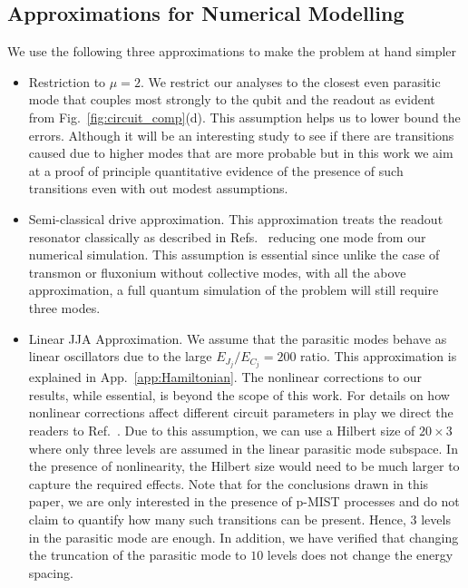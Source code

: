 \documentclass[%
reprint,
superscriptaddress,
 amsmath,amssymb,
 aps,
 prx,
longbibliography,
floatfix,
]{revtex4-2}
\newcommand{\singh}[1]{{\color{orange}{{}#1}}}%
\begin{document}
\subsection{Approximations for Numerical Modelling}\label{app:numerics}
We use the following three approximations to make the problem at hand simpler
\begin{itemize}
    \item Restriction to $\mu=2$. We restrict our analyses to the closest even parasitic mode that couples most strongly to the qubit and the readout as evident from Fig.~\ref{fig:circuit_comp}(d). This assumption helps us to lower bound the errors. Although it will be an interesting study to see if there are transitions caused due to higher modes that are more probable but in this work we aim at a proof of principle quantitative evidence of the presence of such transitions even with out modest assumptions.

    \item Semi-classical drive approximation. This approximation treats the readout resonator classically as described in Refs.~\cite{xiao2023diagrammatic,dumas2024unified,cohen2023reminiscence,khezri2023measurement} reducing one mode from our numerical simulation. This assumption is essential since unlike the case of transmon or fluxonium without collective modes, with all the above approximation, a full quantum simulation of the problem will still require three modes.

    \item Linear JJA Approximation. We assume that the parasitic modes behave as linear oscillators due to the large $E_{J_j}/E_{C_j}=200$ ratio. This approximation is explained in App.~\ref{app:Hamiltonian}. The nonlinear corrections to our results, while essential, is beyond the scope of this work. For details on how nonlinear corrections affect different circuit parameters in play we direct the readers to Ref.~\cite{viola2015collective}. Due to this assumption, we can use a Hilbert size of $20\times 3$ where only three levels are assumed in the linear parasitic mode subspace. In the presence of nonlinearity, the Hilbert size would need to be much larger to capture the required effects. Note that for the conclusions drawn in this paper, we are only interested in the presence of p-MIST processes and do not claim to quantify how many such transitions can be present. Hence, $3$ levels in the parasitic mode are enough. In addition, we have verified that changing the truncation of the parasitic mode to $10$ levels does not change the energy spacing.
\end{itemize}
\singh{Here goes the truncation figure}
\end{document}
